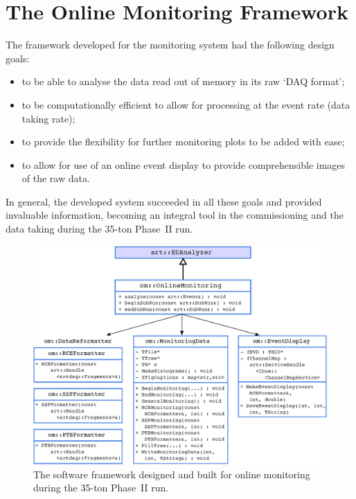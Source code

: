 
\section{The Online Monitoring Framework}\label{sec:OnlineMonitoring}

The framework developed for the monitoring system had the following design goals:
\begin{itemize}
\item to be able to analyse the data read out of memory in its raw `DAQ format';
\item to be computationally efficient to allow for processing at the event rate (data taking rate);
\item to provide the flexibility for further monitoring plots to be added with ease;
\item to allow for use of an online event display to provide comprehensible images of the raw data.
\end{itemize}
In general, the developed system succeeded in all these goals and provided invaluable information, becoming an integral tool in the commissioning and the data taking during the 35-ton Phase~II run.

\begin{figure}
  \centering
  \includegraphics[width=12cm]{softwareFramework.eps}
  \caption[The software framework designed and built for online monitoring during the 35-ton Phase~II run.]{The software framework designed and built for online monitoring during the 35-ton Phase~II run.}
  \label{fig:OnlineMonitoringFramework}
\end{figure}

